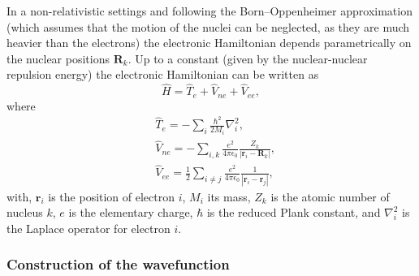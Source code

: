 In a non-relativistic settings and following the Born–Oppenheimer approximation (which assumes that the motion of the nuclei can be neglected, as they are much heavier than the electrons) the electronic Hamiltonian depends parametrically
on the nuclear positions $\mathbf{R}_{k}$.
Up to a constant (given by the nuclear-nuclear repulsion energy) the electronic Hamiltonian can be written as
\begin{equation}
\label{eq:molecularhamiltonian3}
\hat{H} = \hat{T}_e + \hat{V}_{ne} + \hat{V}_{ee},
\end{equation}
where
\begin{align} \label{eq:molecularhamiltonian2}
&\hat{T}_e = -\sum_{i} \frac{\hbar^{2}}{2 M_{i}} \nabla_{i}^{2}, \\
&\hat{V}_{ne} = -\sum_{i, k} \frac{e^{2}}{4 \pi \epsilon_{0}} \frac{Z_{k}}{\left|\mathbf{r}_{i}-\mathbf{R}_{k}\right|}, \\
&\hat{V}_{ee} = \frac{1}{2} \sum_{i \neq j} \frac{e^{2}}{4 \pi \epsilon_{0}} \frac{1}{\left|\mathbf{r}_{i}-\mathbf{r}_{j}\right|},
\end{align} 
with, $\mathbf{r}_{i}$ is the position of electron $i$, $M_{i}$ its mass, $Z_k$ is the atomic number of nucleus $k$, $e$ is the elementary charge, $\hbar$ is the reduced Plank constant, and $\nabla_{i}^2$ is the Laplace operator for electron $i$. 

\subsubsection{Construction of the wavefunction}

